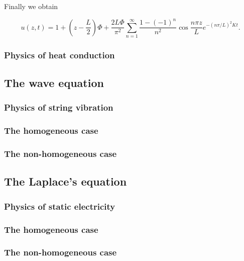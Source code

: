 Finally we obtain

$$
u(z, t)=1+\left(z-\frac{L}{2}\right) \Phi+\frac{2 L \Phi}{\pi^2} \sum_{n=1}^{\infty} \frac{1-(-1)^n}{n^2} \cos \frac{n \pi z}{L} e^{-(n \pi / L)^2 K t} .
$$





\subsubsection{Physics of heat conduction}

\subsection{The wave equation}

\subsubsection{Physics of string vibration}

\subsubsection{The homogeneous case}

\subsubsection{The non-homogeneous case}


\subsection{The Laplace's equation}

\subsubsection{Physics of static electricity}

\subsubsection{The homogeneous case}

\subsubsection{The non-homogeneous case}
